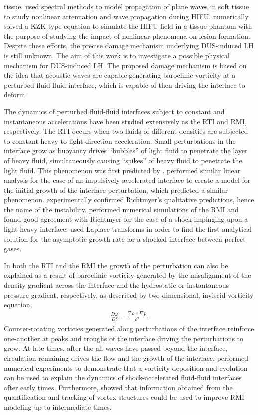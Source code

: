 \documentclass{jfm}%
\begin{document}
tissue. \cite{Khokhlova1997} used spectral methods to model
propagation of plane waves in soft tissue to study nonlinear
attenuation and wave propagation during
\ac{HIFU}. \cite{Khokhlova2006} numerically solved a KZK-type equation
to simulate the \ac{HIFU} field in a tissue phantom with the purpose
of studying the impact of nonlinear phenomena on lesion formation.
Despite these efforts, the precise damage mechanism underlying
\ac{DUS}-induced \ac{LH} is still unknown. The aim of this work is to
investigate a possible physical mechanism for \ac{DUS}-induced
\ac{LH}. The proposed damage mechanism is based on the idea that
acoustic waves are capable generating baroclinic vorticity at a
perturbed fluid-fluid interface, which is capable of then driving the
interface to deform.

The dynamics of perturbed fluid-fluid interfaces subject to constant
and instantaneous accelerations have been studied extensively as the
\ac{RTI} and \ac{RMI}, respectively. The \ac{RTI} occurs when two
fluids of different densities are subjected to constant heavy-to-light
direction acceleration. Small perturbations in the interface grow as
buoyancy drives ``bubbles'' of light fluid to penetrate the layer of
heavy fluid, simultaneously causing ``spikes'' of heavy fluid to
penetrate the light fluid. This phenomenon was first predicted by
\cite{Taylor1950}. \cite{Richtmyer1960} performed similar linear
analysis for the case of an impulsively accelerated interface to
create a model for the initial growth of the interface perturbation,
which predicted a similar phenomenon. \cite{Meshkov1969}
experimentally confirmed Richtmyer's qualitative predictions, hence
the name of the instability. \cite{Meyer1972} performed numerical
simulations of the \ac{RMI} and found good agreement with Richtmyer
for the case of a shock impinging upon a light-heavy
interface. \cite{Fraley1986} used Laplace transforms in order to find
the first analytical solution for the asymptotic growth rate for a
shocked interface between perfect gases. 

In both the \ac{RTI} and the \ac{RMI} the growth of the perturbation
can also be explained as a result of baroclinic vorticity generated by
the misalignment of the density gradient across the interface and the
hydrostatic or instantaneous pressure gradient, respectively, as
described by two-dimensional, inviscid vorticity equation,
\begin{align}
  \label{eq:baroclinic_equation}
  \frac{D\omega}{Dt} = \frac{\nabla \rho \times \nabla p}{\rho^2}.%
\end{align}
Counter-rotating vorticies generated along perturbations of the
interface reinforce one-another at peaks and troughs of the interface
driving the perturbations to grow. At late times, after the all waves
have passed beyond the interface, circulation remaining drives the
flow and the growth of the interface. \cite{Hawley1989} performed
numerical experiments to demonstrate that a vorticity deposition and
evolution can be used to explain the dynamics of shock-accelerated
fluid-fluid interfaces after early times. Furthermore,
\cite{Zabusky1999} showed that information obtained from the
quantification and tracking of vortex structures could be used to
improve \ac{RMI} modeling up to intermediate times.
\end{document}
